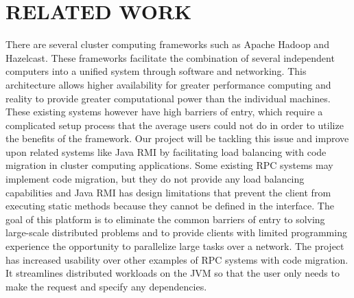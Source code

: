 \section{RELATED WORK}\label{sec:related}

There are several cluster computing frameworks such as Apache Hadoop and Hazelcast. These frameworks facilitate the combination of several independent computers into a unified system through software and networking. This architecture allows higher availability for greater performance computing and reality to provide greater computational power than the individual machines. These existing systems however have high barriers of entry, which require a complicated
setup process that the average users could not do in order to utilize the benefits of the framework. Our project will be tackling this issue and improve upon
related systems like Java RMI by facilitating load balancing with
code migration in cluster computing applications.
Some existing RPC systems may implement code
migration, but they do not provide any load balancing
capabilities and Java RMI has design limitations
that prevent the client from executing static
methods because they cannot be defined in the interface.
The goal of this platform is to eliminate
the common barriers of entry to solving large-scale
distributed problems and to provide clients with
limited programming experience the opportunity to
parallelize large tasks over a network.
The project has increased usability over other
examples of RPC systems with code migration. It
streamlines distributed workloads on the JVM so
that the user only needs to make the request and
specify any dependencies.
